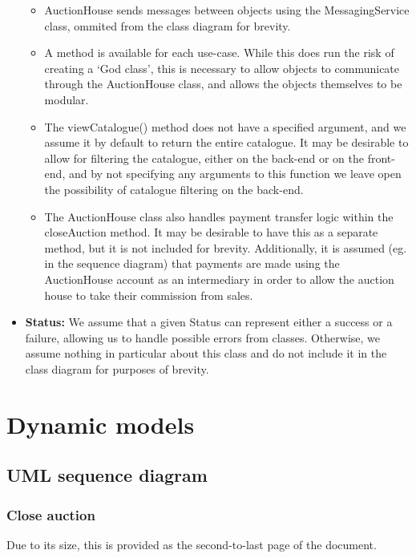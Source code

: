 \documentclass[titlepage, 12pt]{extarticle}
\begin{document}
\begin{itemize}
\begin{itemize}
    \item AuctionHouse sends messages between objects using the MessagingService class, ommited from the class diagram for brevity.
    \item A method is available for each use-case. While this does run the risk of creating a `God class', this is necessary to allow objects to communicate through the AuctionHouse class, and allows the objects themselves to be modular.
    \item The viewCatalogue() method does not have a specified argument, and we assume it by default to return the entire catalogue. It may be desirable to allow for filtering the catalogue, either on the back-end or on the front-end, and by not specifying any arguments to this function we leave open the possibility of catalogue filtering on the back-end. 
    \item The AuctionHouse class also handles payment transfer logic within the closeAuction method. It may be desirable to have this as a separate method, but it is not included for brevity. Additionally, it is assumed (eg. in the sequence diagram) that payments are made using the AuctionHouse account as an intermediary in order to allow the auction house to take their commission from sales.
  \end{itemize}
\item {\bf Status: } We assume that a given Status can represent either a success or a failure, allowing us to handle possible errors from classes. Otherwise, we assume nothing in particular about this class and do not include it in the class diagram for purposes of brevity. 
\end{itemize}
\section{Dynamic models}
\subsection{UML sequence diagram}
\subsubsection{Close auction}
Due to its size, this is provided as the second-to-last page of the document.
\end{document}
